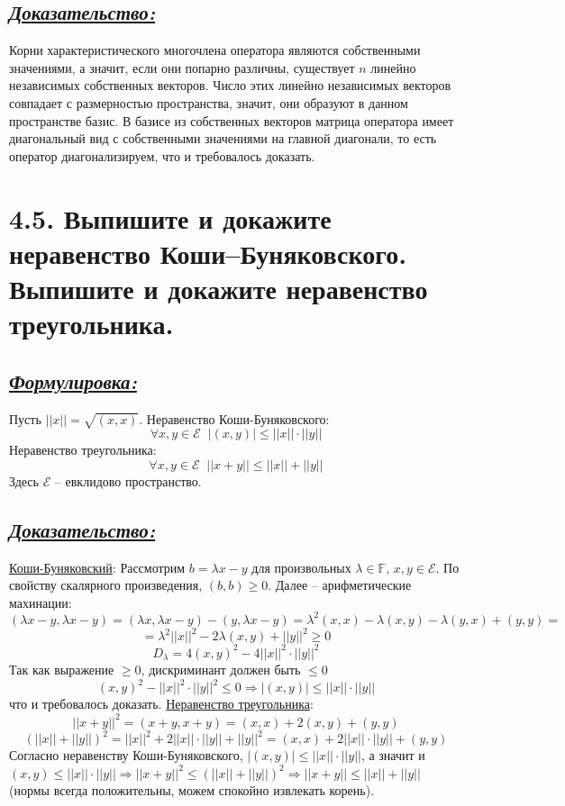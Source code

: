 \documentclass{article}
\begin{document}
\subsection*{\Large \underline{\textit{Доказательство: }}}
Корни характеристического многочлена оператора являются собственными значениями, а значит, если они попарно различны, существует $n$ линейно независимых собственных векторов. Число этих линейно независимых векторов совпадает с размерностью пространства, значит, они образуют в данном пространстве базис. В базисе из собственных векторов матрица оператора имеет диагональный вид с собственными значениями на главной диагонали, то есть оператор диагонализируем, что и требовалось доказать.  

\section*{\LARGE 4.5. Выпишите и докажите неравенство Коши–Буняковского. Выпишите и докажите неравенство треугольника.  }
\subsection*{\Large \underline{\textit{Формулировка: }}}
Пусть $||x|| = \sqrt{(x, x)}$.
\newline Неравенство Коши-Буняковского:
$$
\forall x, y \in \mathcal{E} \;\; |(x, y)| \le ||x||\cdot ||y||
$$
Неравенство треугольника:
$$
\forall x,y \in \mathcal{E} \;\; ||x + y|| \le ||x|| + ||y||
$$
Здесь $\mathcal{E}$ -- евклидово пространство.

\subsection*{\Large \underline{\textit{Доказательство: }}}
\underline{Коши-Буняковский}:
\newline Рассмотрим $b = \lambda x - y$ для произвольных $\lambda \in \mathbb{F},\, x,y \in \mathcal{E}$. По свойству скалярного произведения, $(b, b) \ge 0$. Далее -- арифметические махинации:
$$(\lambda x - y, \lambda x - y) = (\lambda x, \lambda x - y) - (y, \lambda x - y) = \lambda^2(x, x) - \lambda(x, y) - \lambda(y, x) + (y, y) = $$ 
$$ = \lambda^2||x||^2 - 2\lambda(x, y) + ||y||^2 \ge 0 $$
$$ D_\lambda = 4(x, y)^2 - 4||x||^2\cdot||y||^2 $$
Так как выражение $\ge 0$, дискриминант должен быть $ \le 0$
$$
(x, y)^2 - ||x||^2\cdot||y||^2 \le 0 \Rightarrow |(x, y)| \le ||x||\cdot||y||
$$
что и требовалось доказать.
\newline \underline{Неравенство треугольника}:
$$||x + y||^2 = (x + y, x + y) = (x, x) + \boxed{2(x, y)} + (y, y)$$
$$(||x|| + ||y||)^2 = ||x||^2 + 2||x||\cdot||y|| + ||y||^2 = (x, x) + \boxed{2||x||\cdot||y||} + (y, y)$$
Согласно неравенству Коши-Буняковского, $|(x, y)| \le ||x||\cdot||y||$, а значит и $(x, y) \le ||x||\cdot||y|| \Rightarrow ||x + y||^2 \le (||x|| + ||y||)^2 \Rightarrow ||x + y|| \le ||x|| + ||y||$ (нормы всегда положительны, можем спокойно извлекать корень).
\end{document}
